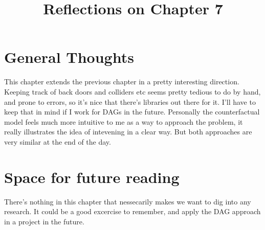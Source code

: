 \documentclass[10pt, english]{article}
\begin{document}
\title{Reflections on Chapter 7}
\date{}
\author{}

\maketitle


\section*{General Thoughts}
This chapter extends the previous chapter in a pretty interesting direction. Keeping track of back doors and colliders etc seems pretty tedious to do by hand, and prone to errors, so it's nice that there's libraries out there for it. I'll have to keep that
in mind if I work for DAGs in the future. Personally the counterfactual model feels much more intuitive to me as a way to approach the problem, it really illustrates the idea of intevening in a clear way. But both approaches are very similar at the end of the day.


\section*{Space for future reading}
There's nothing in this chapter that nessecarily makes we want to dig into any research. It could be a good excercise to remember, and apply the DAG approach in a project in the future.
\end{document}
